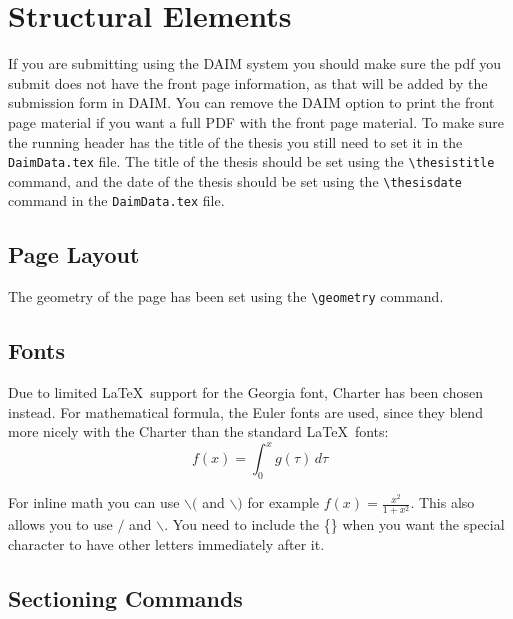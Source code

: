 \chapter{Structural Elements}
\label{chap:structural}

If you are submitting using the DAIM system you should make sure the pdf you submit does not have the front page information, as that will be added by the submission form in DAIM.  You can remove the DAIM option to print the front page material if you want a full PDF with the front page material. To make sure the running header has the title of the thesis you still need to set it in the \verb+DaimData.tex+ file. The title of the thesis should be set using the \verb+\thesistitle+
command, and the date of the thesis should be set using the
\verb+\thesisdate+ command in the \verb+DaimData.tex+ file. 

\section{Page Layout}

The geometry of the page has been set using the \verb+\geometry+
command.

\section{Fonts}

Due to limited \LaTeX\ support for the Georgia font, Charter has been
chosen instead. For mathematical formula, the Euler fonts are used,
since they blend more nicely with the Charter than the standard
\LaTeX\ fonts: 
\begin{equation} \label{eq:1}
    f(x) = \int_0^x g(\tau)\,d\tau
\end{equation}



For inline math you can use $\backslash{}($ and $\backslash{})$ for example \( f(x)= \frac{x^2}{1+x^2} \).  
This also allows you to use $\slash$ and $\backslash$. You need to include the \{\} when you want the special
character to have other letters immediately after it.

\section{Sectioning Commands}


